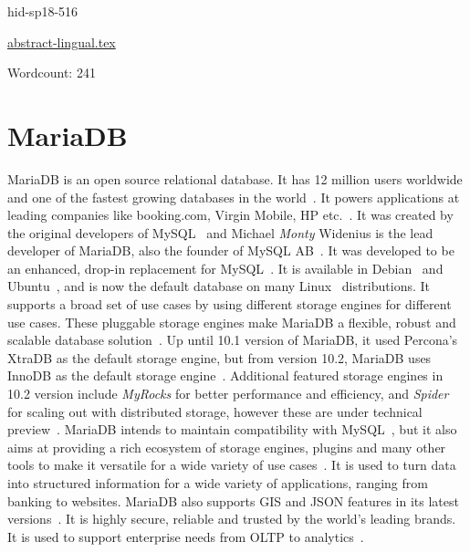 \begin{IU}

hid-sp18-516

\href{https://github.com/cloudmesh-community/hid-sp18-516/blob/master//technology/abstract-lingual.tex}{abstract-lingual.tex}

 

Wordcount: 241

\end{IU}

\section{MariaDB}


MariaDB is an open source relational database. It has 12 million users worldwide 
and one of the fastest growing databases in the 
world~\cite{hid-sp18-516-www-mariadb}. It powers applications at leading 
companies like booking.com, Virgin Mobile, HP 
etc.~\cite{hid-sp18-516-www-mariadb}. It was created by the original developers
of MySQL~\cite{hid-sp18-516-www-wiki-mysql} and Michael \textit{Monty} Widenius 
is the lead developer of MariaDB, also the founder of MySQL 
AB~\cite{hid-sp18-516-www-wiki-mariadb}. It was developed to be an enhanced, 
drop-in replacement for MySQL~\cite{hid-sp18-516-www-mariadb-foundation}. It is 
available in Debian~\cite{hid-sp18-516-www-debian-org} and 
Ubuntu~\cite{hid-sp18-516-www-wiki-ubuntu}, and is now the default database on 
many Linux~\cite{hid-sp18-516-www-wiki-linux} distributions. It supports a broad 
set of use cases by using different storage engines for different use cases. These 
pluggable storage engines make MariaDB a flexible, robust and scalable database 
solution~\cite{hid-sp18-516-www-mariadb-server}. Up until 10.1 version of MariaDB, 
it used Percona's XtraDB as the default storage engine, but from version 10.2, 
MariaDB uses InnoDB as the default storage 
engine~\cite{hid-sp18-516-www-wiki-xtradb}. Additional featured storage engines
in 10.2 version include \textit{MyRocks} for better performance and efficiency,
and \textit{Spider} for scaling out with distributed storage, however these are
under technical preview~\cite{hid-sp18-516-www-mariadb-server}. MariaDB intends
to maintain compatibility with MySQL~\cite{hid-sp18-516-www-wiki-mariadb}, but
it also aims at providing a rich ecosystem of storage engines, plugins and many
other tools to make it versatile for a wide variety of use
cases~\cite{hid-sp18-516-www-mariadb-foundation}. It is used to turn data into
structured information for a wide variety of applications, ranging from banking
to websites. MariaDB also supports GIS and JSON features in its latest
versions~\cite{hid-sp18-516-www-mariadb-foundation}. It is highly secure,
reliable and trusted by the world's leading brands. It is used to support
enterprise needs from OLTP to analytics~\cite{hid-sp18-516-www-mariadb}.


